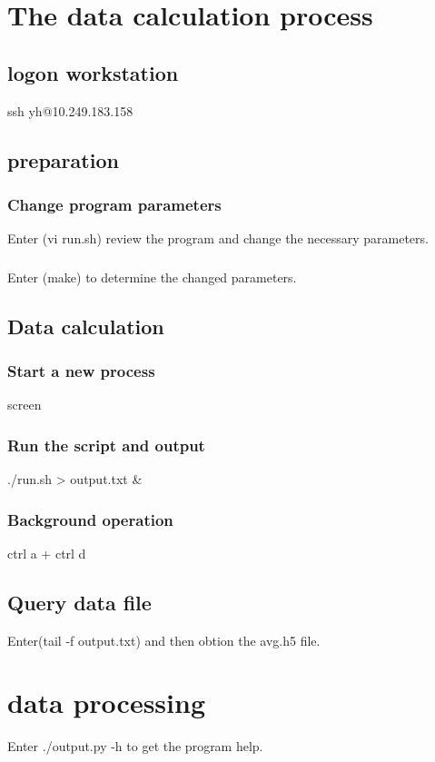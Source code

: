 \section{The data calculation process}
\subsection{logon workstation}
ssh yh@10.249.183.158
\subsection{preparation}
\subsubsection{Change program parameters}
Enter (vi run.sh) review the program and change the necessary parameters.
\subsubsection{}
Enter (make) to determine the changed parameters.
\subsection{Data calculation}
\subsubsection{Start a new process}
screen
\subsubsection{Run the script and output}
./run.sh > output.txt  \&
\subsubsection{Background operation}
ctrl a + ctrl d
\subsection{Query data file}
Enter(tail -f output.txt) and then obtion the avg.h5 file.

\section{data processing}
Enter ./output.py -h to get the program help.

